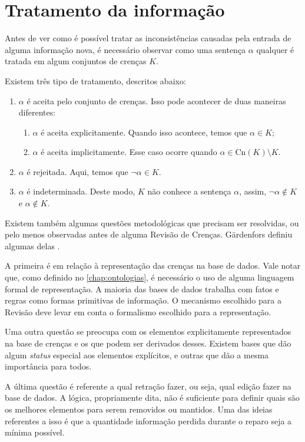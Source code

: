 \section{Tratamento da informação}

Antes de ver como é possível tratar as inconsistências causadas pela entrada de alguma informação nova, é necessário observar como uma sentença $ \alpha $ qualquer é tratada em algum conjuntos de crenças $ K $.

Existem três tipo de tratamento, descritos abaixo:

\begin{enumerate}
	\item $ \alpha $ é aceita pelo conjunto de crenças. Isso pode acontecer de duas maneiras diferentes:
	\begin{enumerate}
		\item $ \alpha $ é aceita explicitamente. Quando isso acontece, temos que $ \alpha \in K $;
		\item $ \alpha $ é aceita implicitamente. Esse caso ocorre quando $ \alpha \in \text{Cn}(K) \setminus K $.
	\end{enumerate}
	\item $ \alpha $ é rejeitada. Aqui, temos que $ \lnot \alpha \in K $. 
	\item $ \alpha $ é indeterminada. Deste modo, $ K $ não conhece a sentença $ \alpha $, assim, $ \lnot \alpha \notin K $ e $ \alpha \notin K $.
\end{enumerate}

Existem também algumas questões metodológicas que precisam ser resolvidas, ou pelo menos observadas antes de alguma Revisão de Crenças. Gärdenfors definiu algumas delas  \citep{revisaoGardenfors2}.

A primeira é em relação à representação das crenças na base de dados. Vale notar que, como definido no \autoref{chap:ontologias}, é necessário o uso de alguma linguagem formal de representação. A maioria das bases de dados trabalha com fatos e regras como formas primitivas de informação. O mecanismo escolhido para a Revisão deve levar em conta o formalismo escolhido para a representação.

Uma outra questão se preocupa com os elementos explicitamente representados na base de crenças e os que podem ser derivados desses. Existem bases que dão algum \textit{status} especial aos elementos explícitos, e outras que dão a mesma importância para todos. 

A última questão é referente a qual retração fazer, ou seja, qual edição fazer na base de dados. A lógica, propriamente dita, não é suficiente para definir quais são os melhores elementos para serem removidos ou mantidos. Uma das ideias referentes a isso é que a quantidade informação perdida durante o reparo seja a mínima possível. 

